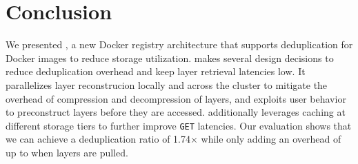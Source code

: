 \section{Conclusion}
\label{sec:conclusion}

We presented \sysname, a new Docker registry architecture that supports deduplication for
Docker images to reduce storage utilization. \sysname makes several design decisions to
reduce deduplication overhead and keep layer retrieval latencies low. It parallelizes
layer reconstrucion locally and across the cluster to mitigate the overhead of
compression and decompression of layers, and exploits user behavior to preconstruct
layers before they are accessed. \sysname additionally leverages caching at different
storage tiers to further improve \texttt{GET} latencies. Our evaluation shows that
we can achieve a deduplication ratio of 1.74$\times$ while only adding an overhead
of up to \gap when layers are pulled.
